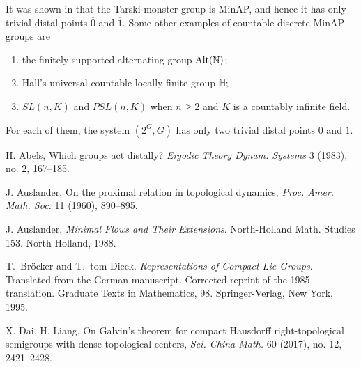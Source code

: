 \documentclass[11pt]{amsart}
\theoremstyle{definition}
\numberwithin{equation}{section}
\theoremstyle{definition}
\begin{document}
It was shown in \cite{XY} that the Tarski monster group is MinAP, and hence it has only trivial distal points $\overline{0}$ and $\overline{1}$. Some other examples of countable discrete MinAP groups are
\begin{enumerate}
\item[(i)] the finitely-supported alternating group $\mbox{\rm Alt}(\mathbb{N})$;
\item[(ii)] Hall's universal countable locally finite group $\mathbb{H}$;
\item[(iii)] $SL(n,K)$ and $PSL(n,K)$ when $n\geq 2$ and $K$ is a countably infinite field.
\end{enumerate}
For each of them, the system $(2^G,G)$ has only two trivial distal points $\overline{0}$ and $\overline{1}$.



H. Abels,
Which groups act distally?
\textit{Ergodic Theory Dynam. Systems} 3 (1983), no. 2, 167--185.

J. Auslander,
On the proximal relation in topological dynamics,
\textit{Proc. Amer. Math. Soc.} 11 (1960), 890--895.

J. Auslander,
\textit{Minimal Flows and Their Extensions}. North-Holland Math. Studies 153. North-Holland, 1988.

T.~Bröcker and T.~tom Dieck. {\it Representations of Compact Lie Groups}. Translated from the German manuscript. Corrected reprint of the 1985 translation. Graduate Texts in Mathematics, 98. Springer-Verlag, New York, 1995.

X. Dai, H. Liang, 
On Galvin's theorem for compact Hausdorff right-topological semigroups with dense topological centers, 
\textit{Sci. China Math.} 60 (2017), no. 12, 2421--2428.




\end{document}
